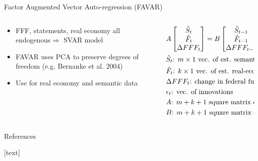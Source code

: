 \documentclass{beamer}
\begin{document}
\begin{frame}{Factor Augmented Vector Auto-regression (FAVAR)}
	
	\begin{columns}
		\begin{column}{0.48\textwidth}
			\begin{itemize}
				\item FFF, statements, real economy all endogenous\quad $\Rightarrow$ SVAR model
				\item FAVAR uses PCA to preserve degrees of freedom (e.g. Bernanke et al. 2004)
				\item Use for real economy and semantic data
			\end{itemize}
		\end{column}
		\begin{column}{0.5\textwidth}
			 \scriptsize\begin{align}
			&A\begin{bmatrix}
			\hat{S}_t\\\hat{F}_t\\\-\Delta FFF_t
			\end{bmatrix} =
			B\begin{bmatrix}
			\hat{S}_{t-1}\\\hat{F}_{t-1}\\\Delta FFF_{t-1}
			\end{bmatrix} + \epsilon_t \nonumber \\
			&\hat{S}_t\text{: $m\times1$ vec. of est. semantic factors} \nonumber \\
			&\hat{F}_t\text{: $k\times1$ vec. of est. real-economic factors} \nonumber \\
			&\Delta FFF_t\text{: change in federal funds futures rate} \nonumber \\
			&\epsilon_t\text{: vec. of innovations} \nonumber \\
			&A\text{: $m+k+1$ square matrix of contemp. coeff.} \nonumber \\
			&B\text{: $m+k+1$ square matrix of lag coeff.} \nonumber
			\end{align}
		\end{column}
	\end{columns}
\end{frame}


\begin{frame}{References}
\nocite{gurkaynak2005actions}
\nocite{campbell2012macroeconomic}
\nocite{le2014distributed}
\nocite{mikolov2013efficient}
\nocite{bernanke2005measuring}

[text]



\end{frame}
\end{document}

